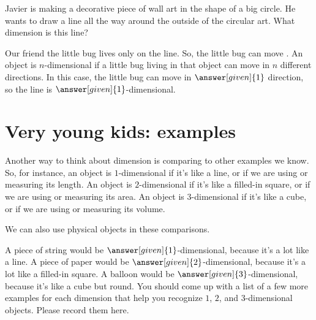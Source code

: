 \documentclass{ximera}
\begin{document}

\begin{example}
	Javier is making a decorative piece of wall art in the shape of a big circle. He wants to draw a line all the way around the outside of the circular art. What dimension is this line?
	
	\begin{explanation}
		Our friend the little bug lives only on the line. So, the little bug can move . An object is $n$-dimensional if a little bug living in that object can move in $n$ different directions. In this case, the little bug can move in $\answer[given]{1}$ direction, so the line is $\answer[given]{1}$-dimensional.  
	\end{explanation}
\end{example}


\section{Very young kids: examples}

Another way to think about dimension is comparing to other examples we know. So, for instance, an object is $1$-dimensional if it's like a line, or if we are using or measuring its length. An object is $2$-dimensional if it's like a filled-in square, or if we are using or measuring its area. An object is $3$-dimensional if it's like a cube, or if we are using or measuring its volume.

We can also use physical objects in these comparisons. 
\begin{example} A piece of string would be $\answer[given]{1}$-dimensional, because it's a lot like a line. A piece of paper would be $\answer[given]{2}$-dimensional, because it's a lot like a filled-in square. A balloon would be $\answer[given]{3}$-dimensional, because it's like a cube but round. You should come up with a list of a few more examples for each dimension that help you recognize $1$, $2$, and $3$-dimensional objects. Please record them here.
\begin{freeResponse}

\end{freeResponse}
\end{example}
\end{document}
